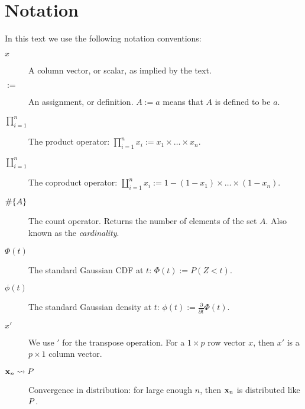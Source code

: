 


\chapter{Notation}
\label{apx:notation}

In this text we use the following notation conventions:
\begin{description}
\item[$x$] A column vector, or scalar, as implied by the text. 
\item[$:=$] An assignment, or definition. $A:=a$ means that $A$ is defined to be $a$. 
\item[$\prod_{i=1}^{n}$] The product operator: $\prod_{i=1}^{n} x_i:= x_1 \times \dots \times x_n$.
\item[$\coprod_{i=1}^{n}$] The coproduct operator: $\coprod_{i=1}^{n} x_i:= 1-(1-x_1) \times \dots \times (1-x_n)$.
\item[$\#\{ A \}$] The count operator. Returns the number of elements of the set $A$. Also known as the \emph{cardinality}.
\item[$\Phi(t)$] The standard Gaussian CDF at $t$: $\Phi(t):= P(Z<t)$.
\item[$\phi(t)$] The standard Gaussian density at $t$: $\phi(t):= \frac{\partial}{\partial t}\Phi(t)$.
\item[$x'$] We use $'$ for the transpose operation. For a $1\times p$ row vector $x$, then $x'$ is a $p \times 1$ column vector.
\item[$\mathbf{x}_n \rightsquigarrow P$] Convergence in distribution: for large enough $n$, then $\mathbf{x}_n$ is distributed like $P$.
\end{description}


